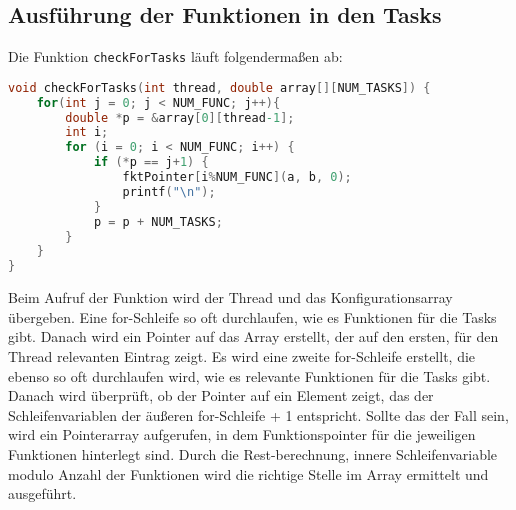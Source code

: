 \subsection{Ausführung der Funktionen in den Tasks}

Die Funktion \texttt{checkForTasks} läuft folgendermaßen ab:
\begin{lstlisting}[language=C]
void checkForTasks(int thread, double array[][NUM_TASKS]) {
    for(int j = 0; j < NUM_FUNC; j++){
        double *p = &array[0][thread-1];
        int i;
        for (i = 0; i < NUM_FUNC; i++) {
            if (*p == j+1) {
                fktPointer[i%NUM_FUNC](a, b, 0);
                printf("\n");
            }
            p = p + NUM_TASKS;
        }
    }
}
\end{lstlisting}

Beim Aufruf der Funktion wird der Thread und das Konfigurationsarray übergeben. Eine for-Schleife so oft durchlaufen, wie es Funktionen für die Tasks gibt. Danach wird ein Pointer auf das Array erstellt, der auf den ersten, für den Thread relevanten Eintrag zeigt. 
Es wird eine zweite for-Schleife erstellt, die ebenso so oft durchlaufen wird, wie es relevante Funktionen für die Tasks gibt. Danach wird überprüft, ob der Pointer auf ein Element zeigt, das der Schleifenvariablen der äußeren for-Schleife + 1 entspricht. Sollte das der Fall sein, wird ein Pointerarray aufgerufen, in dem Funktionspointer für die jeweiligen Funktionen hinterlegt sind. Durch die Rest-berechnung, innere Schleifenvariable  modulo  Anzahl der Funktionen wird die richtige Stelle im Array ermittelt und ausgeführt. 
